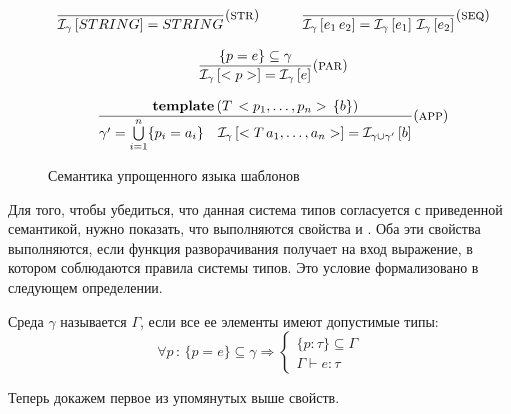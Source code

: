 \begin{figure}[htbp]
$$
\begin{array}{ccc}
\trule{}{\Inst{\gamma}{STRING} = STRING }{str}
&\quad&
\trule{}{
	\Inst{\gamma}{e_1 \, e_2} = 
		\Inst{\gamma}{e_1} \, \Inst{\gamma}{e_2} 
}{seq}
\\
&&\,\\
\multicolumn{3}{c}{
\trule{
	\{p = e\} \subseteq \gamma
}{
	\Inst{\gamma}{<p>} = \Inst{\gamma}{e}
}{par}
}
\\
&&\,\\
\multicolumn{3}{c}{
\trule{
	\mathbf{template}\left(
		T \, <p_1, \ldots, p_n> \, \{ b \}
	\right)
}{
	\gamma' = \bigcup\limits_{i=1}^{n} \{ p_i = a_i \}
	\quad	
	\Inst{\gamma}{<T \, a_1, \ldots, a_n>} = \Inst{\gamma \cup \gamma'}{b}
}{app}
}
\end{array}
$$
	\caption{Семантика упрощенного языка шаблонов}\label{TempSem}
\end{figure}

Для того, чтобы убедиться, что данная система типов согласуется с приведенной семантикой, нужно показать, что выполняются свойства  и  \cite{???}. Оба эти свойства выполняются, если функция разворачивания получает на вход выражение, в котором соблюдаются правила системы типов. Это условие формализовано в следующем определении.

\begin{Def}\label{agree}
Среда $\gamma$ называется  $\Gamma$, если все ее элементы имеют допустимые типы:
$$
	\forall p \, : \, 
		\{p = e\} \subseteq \gamma 
			\Rightarrow 
		\left\{\begin{array}{l}		
		\{p : \tau\} \subseteq \Gamma \\
		\Gamma \vdash e : \tau
		\end{array}\right.
$$
\end{Def}

Теперь докажем первое из упомянутых выше свойств.

